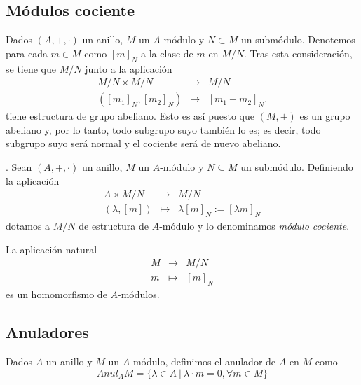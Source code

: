 \documentclass[../main.tex]{subfiles}
\begin{document}
\subsection{Módulos cociente}
Dados $(A,+,\cdot)$ un anillo, $M$ un $A$-módulo y $N\subset M$ un submódulo. Denotemos para cada $m\in M$ como $[m]_N$ a la clase de $m$ en $M/N$. Tras esta consideración, se tiene que $M/N$ junto a la aplicación
$$\begin{array}{rcl}
    M/N\times M/N&\longrightarrow&M/N\\
    ([m_1]_N,[m_2]_N)&\longmapsto&[m_1+m_2]_N.
\end{array}$$
tiene estructura de grupo abeliano. Esto es así puesto que $(M,+)$ es un grupo abeliano y, por lo tanto, todo subgrupo suyo también lo es; es decir, todo subgrupo suyo será normal y el cociente será de nuevo abeliano.

\begin{definition}. Sean $(A,+,\cdot)$ un anillo, $M$ un $A$-módulo y $N\subseteq M$ un submódulo. Definiendo la aplicación
$$\begin{array}{rcl}
    A\times M/N&\longrightarrow&M/N\\
    (\lambda,[m])&\longmapsto&\lambda[m]_N:=[\lambda m]_N
\end{array}$$
dotamos a $M/N$ de estructura de $A$-módulo y lo denominamos \textit{módulo cociente}.
\end{definition}

\begin{remark} La aplicación natural
$$\begin{array}{rcl}
    M&\longrightarrow&M/N\\
    m&\longmapsto&[m]_N
\end{array}$$
es un homomorfismo de $A$-módulos.
\end{remark}
\subsection{Anuladores}
\begin{definition} Dados $A$ un anillo y $M$ un $A$-módulo, definimos el anulador de $A$ en $M$ como$$Anul_A M = \{\lambda\in A\ |\  \lambda\cdot m=0, \forall m\in M\}$$
\end{definition}
\end{document}
